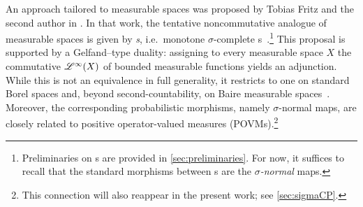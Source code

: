 An approach tailored to measurable spaces was proposed by Tobias Fritz and the second author in \cite{fritz2025categories}.
In that work, the tentative noncommutative analogue of measurable spaces is given by \emph{\cstars{}s}, i.e.\ monotone $\sigma$-complete \cstar{}s~\cite{saito15monotone}.\footnote{Preliminaries on \cstars{}s are provided in \cref{sec:preliminaries}.
	For now, it suffices to recall that the standard morphisms between \cstars{}s are the \emph{$\sigma$-normal} maps.}
This proposal is supported by a Gelfand--type duality: assigning to every measurable space $X$ the commutative \cstars{} $\mathscr{L}^{\infty}(X)$ of bounded measurable functions yields an adjunction.
While this is not an equivalence in full generality, it restricts to one on standard Borel spaces and, beyond second-countability, on Baire measurable spaces~\cite[\S 4.2]{fritz2025categories}.
Moreover, the corresponding probabilistic morphisms, namely $\sigma$-normal \cpu{} maps, are closely related to positive operator-valued measures (POVMs).\footnote{This connection will also reappear in the present work; see \cref{sec:sigmaCP}.}
 
